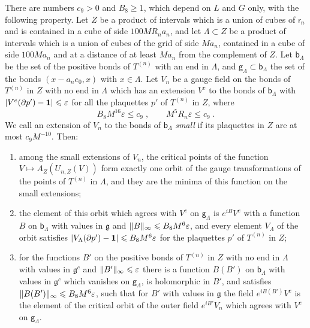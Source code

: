 \documentclass[11pt]{preprint}
\newcommand{\id}{\mathbf 1}
\DeclarePairedDelimiter{\abs}{\lvert}{\rvert}
\DeclarePairedDelimiter{\norm}{\lVert}{\rVert}
\numberwithin{equation}{section}
\begin{document}
\begin{proposition}\label{prop:free-data}
There are numbers $c_9 > 0$ and $B_8 \geqslant 1$, which depend on $L$ and $G$ only, with the following property. Let $Z$ be a product of intervals which is a union of cubes of $\mathsf r_n$ and is contained in a cube of side $100MR_na_n$, and let $\Lambda \subset Z$ be a product of intervals which is a union of cubes of the grid of side $Ma_n$, contained in a cube of side $100Ma_n$ and at a distance of at least $Ma_n$ from the complement of $Z$. Let $\mathsf b_\Lambda$ be the set of the positive bonds of $T^{(n)}$ with an end in $\Lambda$, and $\mathsf g_\Lambda \subset \mathsf b_\Lambda$ the set of the bonds $(x - a_ne_0, x)$ with $x \in \Lambda$. Let $V_n$ be a gauge field on the bonds of $T^{(n)}$ in $Z$ with no end in $\Lambda$ which has an extension $V^e$ to the bonds of $\mathsf b_\Lambda$ with $\abs{V^e(\partial p') - \id} \leqslant \varepsilon$ for all the plaquettes $p'$ of $T^{(n)}$ in $Z$, where
\begin{equation}\label{eq:free-data-smallness}
    B_8M^{16}\varepsilon \leqslant c_9\;,
    \qquad
    M^5R_n\varepsilon \leqslant c_9\;.
\end{equation}
We call an extension of $V_n$ to the bonds of $\mathsf b_\Lambda$ \emph{small} if its plaquettes in $Z$ are at most $c_9M^{-10}$. Then:
\begin{enumerate}[label=(\roman*)]
\item among the small extensions of $V_n$, the critical points of the function $V \mapsto A_Z(U_{n,Z}(V))$ form exactly one orbit of the gauge transformations of the points of $T^{(n)}$ in $\Lambda$, and they are the minima of this function on the small extensions;
\item the element of this orbit which agrees with $V^e$ on $\mathsf g_\Lambda$ is $e^{iB}V^e$ with a function $B$ on $\mathsf b_\Lambda$ with values in $\mathfrak g$ and $\norm B_\infty \leqslant B_8M^6\varepsilon$, and every element $V_\Lambda$ of the orbit satisfies $\abs{V_\Lambda(\partial p') - \id} \leqslant B_8M^6\varepsilon$ for the plaquettes $p'$ of $T^{(n)}$ in $Z$;
\item for the functions $B'$ on the positive bonds of $T^{(n)}$ in $Z$ with no end in $\Lambda$ with values in $\mathfrak g^c$ and $\norm{B'}_\infty \leqslant \varepsilon$ there is a function $B(B')$ on $\mathsf b_\Lambda$ with values in $\mathfrak g^c$ which vanishes on $\mathsf g_\Lambda$, is holomorphic in $B'$, and satisfies $\norm{B(B')}_\infty \leqslant B_8M^6\varepsilon$, such that for $B'$ with values in $\mathfrak g$ the field $e^{iB(B')}V^e$ is the element of the critical orbit of the outer field $e^{iB'}V_n$ which agrees with $V^e$ on $\mathsf g_\Lambda$.
\end{enumerate}
\end{proposition}
\end{document}
